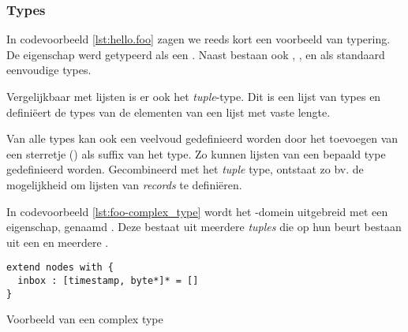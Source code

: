 \vspace{-3mm}

\subsubsection{Types}

In codevoorbeeld \ref{lst:hello.foo} zagen we reeds kort een voorbeeld van
typering. De  eigenschap werd getypeerd als een . Naast
 bestaan ook , ,  en
 als standaard eenvoudige types.

Vergelijkbaar met lijsten is er ook het \emph{tuple}-type. Dit is een lijst van
types en defini\"eert de types van de elementen van een lijst met vaste lengte.

Van alle types kan ook een veelvoud gedefinieerd worden door het toevoegen van
een sterretje (\ttt{*}) als suffix van het type. Zo kunnen lijsten van een
bepaald type gedefinieerd worden. Gecombineerd met het \emph{tuple} type,
ontstaat zo bv. de mogelijkheid om lijsten van \emph{records} te defini\"eren.

In codevoorbeeld \ref{lst:foo-complex_type} wordt het -domein
uitgebreid met een eigenschap, genaamd . Deze bestaat uit meerdere
\emph{tuples} die op hun beurt bestaan uit een  en meerdere
.

\begin{listing}[ht]
  \begin{verbatim}
extend nodes with {
  inbox : [timestamp, byte*]* = []
}
  \end{verbatim}
  \vspace{-5mm}
  \caption{Voorbeeld van een complex type}
  \label{lst:foo-complex_type}
\end{listing}
